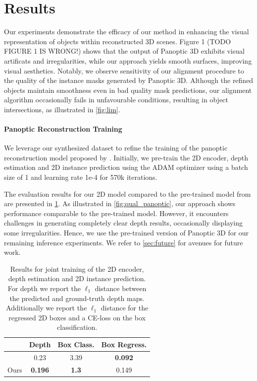 \section{Results}
\label{sec:results}
Our experiments demonstrate the efficacy of our method in enhancing the visual representation of objects within reconstructed 3D scenes. Figure 1 (TODO FIGURE 1 IS WRONG!) shows that the output of Panoptic 3D exhibits visual artificats and irregularities, while our approach yields smooth surfaces, improving visual aesthetics. Notably, we observe sensitivity of our alignment procedure to the quality of the instance masks generated by Panoptic 3D. Although the refined objects maintain smoothness even in bad quality mask predictions, our alignment algorithm occasionally fails in unfavourable conditions, resulting in object intersections, as illustrated in \cref{fig:lim}.

\paragraph{Panoptic Reconstruction Training}

We leverage our synthesized dataset to refine the training of the panoptic reconstruction model proposed by \citet{dahnert2021panoptic}.
Initially, we pre-train the 2D encoder, depth estimation and 2D instance prediction using the ADAM optimizer \citep{kingma2014adam} using a batch size of 1 and learning rate 1e-4 for 570k iterations.

The evaluation results for our 2D model compared to the pre-trained model from \citet{dahnert2021panoptic} are presented in \cref{tab:2dresults}.
As illustrated in \cref{fig:qual_panoptic}, our approach shows performance comparable to the pre-trained model. However, it encounters challenges in generating completely clear depth results, occasionally displaying some irregularities.
Hence, we use the pre-trained version of Panoptic 3D for our remaining inference experiments. We refer to \cref{sec:future} for avenues for future work.
\begin{table}
  \centering
  \begin{tabular}{@{}lccc@{}}
    \toprule
     & Depth & Box Class. & Box Regress. \\
    \midrule
    \citet{dahnert2021panoptic} & 0.23 & 3.39 & \textbf{0.092}\\
    Ours & \textbf{0.196} & \textbf{1.3} & 0.149 \\
    \bottomrule
  \end{tabular}
  \caption{Results for joint training of the 2D encoder, depth estimation and 2D instance prediction. For depth we report the $\ell_1$ distance between the predicted and ground-truth depth maps. Additionally we report the $\ell_1$ distance for the regressed 2D boxes and a CE-loss on the box classification.  }
  \label{tab:2dresults}
\end{table}

